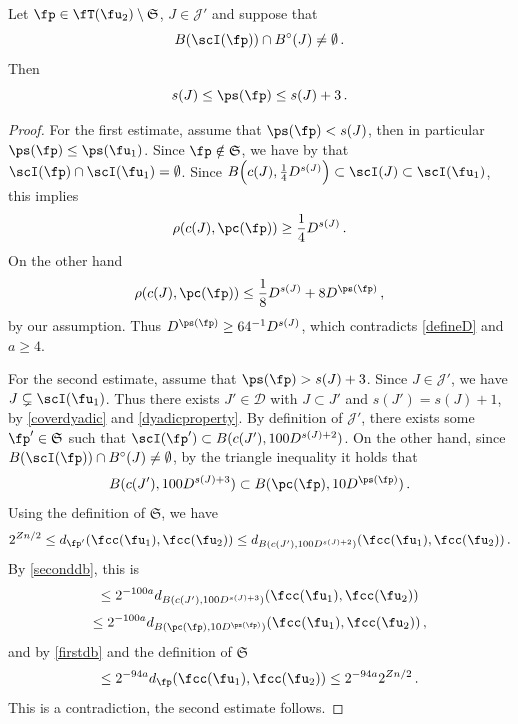     \begin{lemma}
        \label{limited-scale-impact}
        \leanok
        Let $\fp \in \fT(\fu_2) \setminus \mathfrak{S}$, $J \in \mathcal{J}'$ and suppose that
        $$
           B(\scI(\fp)) \cap B^\circ(J) \ne \emptyset\,.
        $$
        Then
        $$
            s(J) \le \ps(\fp) \le s(J) +3\,.
        $$
    \end{lemma}

    \begin{proof}
        \leanok
        For the first estimate, assume that $\ps(\fp) < s(J)$, then in particular $\ps(\fp) \le \ps(\fu_1)$. Since $\fp \notin \mathfrak{S}$, we have by  that $\scI(\fp) \cap \scI(\fu_1) = \emptyset$.
        Since $B\Big(c(J), \frac{1}{4} D^{s(J)}\Big) \subset \scI(J) \subset \scI(\fu_1)$, this implies
        $$
            \rho(c(J), \pc(\fp)) \ge \frac{1}{4}D^{s(J)}\,.
        $$
        On the other hand
        $$
            \rho(c(J), \pc(\fp)) \le \frac{1}{8} D^{s(J)} + 8 D^{\ps(\fp)}\,,
        $$
        by our assumption. Thus $D^{\ps(\fp)} \ge 64^{-1} D^{s(J)}$, which contradicts \eqref{defineD} and $a \ge 4$.

        For the second estimate, assume that $\ps(\fp) > s(J) + 3$. Since $J \in \mathcal{J}'$, we have $J \subsetneq \scI(\fu_1)$. Thus there exists $J' \in \mathcal{D}$ with $J \subset J'$ and $s(J') = s(J) + 1$, by \eqref{coverdyadic} and \eqref{dyadicproperty}. By definition of $\mathcal{J}'$, there exists some $\fp' \in \mathfrak{S}$ such that $\scI(\fp') \subset B(c(J'), 100 D^{s(J) + 2})$. On the other hand, since $B(\scI(\fp)) \cap B^\circ(J) \ne \emptyset$, by the triangle inequality it holds that
        $$
            B(c(J'), 100 D^{s(J) + 3}) \subset B(\pc(\fp), 10 D^{\ps(\fp)})\,.
        $$
        Using the definition of $\mathfrak{S}$, we have
        $$
            2^{Zn/2} \le d_{\fp'}(\fcc(\fu_1), \fcc(\fu_2)) \le d_{B(c(J'), 100 D^{s(J) + 2})}(\fcc(\fu_1), \fcc(\fu_2))\,.
        $$
        By \eqref{seconddb}, this is
        $$
            \le 2^{-100a} d_{B(c(J'), 100 D^{s(J) + 3})}(\fcc(\fu_1), \fcc(\fu_2))
        $$
        $$
            \le 2^{-100a} d_{B(\pc(\fp), 10 D^{\ps(\fp)})}(\fcc(\fu_1), \fcc(\fu_2))\,,
        $$
        and by \eqref{firstdb} and the definition of $\mathfrak{S}$
        $$
            \le 2^{-94a} d_{\fp}(\fcc(\fu_1), \fcc(\fu_2)) \le 2^{-94a} 2^{Zn/2}\,.
        $$
        This is a contradiction, the second estimate follows.
    \end{proof}



